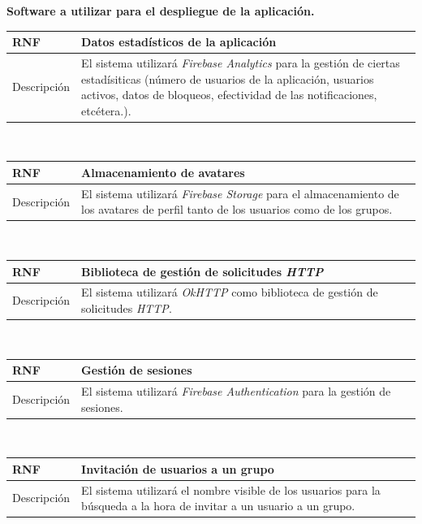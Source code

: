 \documentclass[twoside]{report}
\newcommand\addrow[2]{#1 &#2\\ }
\newcommand\addheading[2]{#1 &#2\\ \hline}
\newcommand\tabularhead{\begin{tabular}{lp{0.7\textwidth}}
\hline
}
\newenvironment{req}{\tabularhead}
{\hline\end{tabular}}
\begin{document}
\vspace{1cm}

\textbf{Software a utilizar para el despliegue de la aplicación.}\\

\begin{req}
	\addheading{\textbf{RNF\arabic{nonFunctionalRequirements}}}{Datos estadísticos de la aplicación}
	\addrow{Descripción}{El sistema utilizará \textit{Firebase Analytics} para la gestión de ciertas estadísiticas (número de usuarios de la aplicación, usuarios activos, datos de bloqueos, efectividad de las notificaciones, etcétera.).}
\end{req}\\

\vspace{0.25cm}

\begin{req}
	\addheading{\textbf{RNF\arabic{nonFunctionalRequirements}}}{Almacenamiento de avatares}
	\addrow{Descripción}{El sistema utilizará \textit{Firebase Storage} para el almacenamiento de los avatares de perfil tanto de los usuarios como de los grupos.}
\end{req}\\

\vspace{0.25cm}

\begin{req}
	\addheading{\textbf{RNF\arabic{nonFunctionalRequirements}}}{Biblioteca de gestión de solicitudes \textit{HTTP}}
	\addrow{Descripción}{El sistema utilizará \textit{OkHTTP} como biblioteca de gestión de solicitudes \textit{HTTP}.}
\end{req}\\

\vspace{0.25cm}

\begin{req}
	\addheading{\textbf{RNF\arabic{nonFunctionalRequirements}}}{Gestión de sesiones}
	\addrow{Descripción}{El sistema utilizará \textit{Firebase Authentication} para la gestión de sesiones.}
\end{req}\\

\vspace{0.25cm}
	
\begin{req}
	\addheading{\textbf{RNF\arabic{nonFunctionalRequirements}}}{Invitación de usuarios a un grupo}
	\addrow{Descripción}{El sistema utilizará el nombre visible de los usuarios para la búsqueda a la hora de invitar a un usuario a un grupo.}
\end{req}\\
\end{document}
